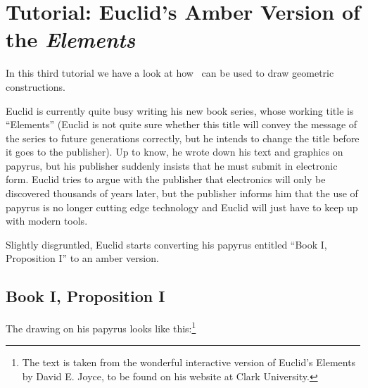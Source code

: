 %
%
%


\section{Tutorial: Euclid's Amber Version of the \emph{Elements}}

In this third tutorial we have a look at how \tikzname\ can be used to draw
geometric constructions.

Euclid is currently quite busy writing his new book series, whose working title
is ``Elements'' (Euclid is not quite sure whether this title will convey the
message of the series to future generations correctly, but he intends to change
the title before it goes to the publisher). Up to know, he wrote down his text
and graphics on papyrus, but his publisher suddenly insists that he must submit
in electronic form. Euclid tries to argue with the publisher that electronics
will only be discovered thousands of years later, but the publisher informs him
that the use of papyrus is no longer cutting edge technology and Euclid will
just have to keep up with modern tools.

Slightly disgruntled, Euclid starts converting his papyrus entitled ``Book I,
Proposition I'' to an amber version.


\subsection{Book I, Proposition I}

The drawing on his papyrus looks like this:\footnote{The text is taken from the
wonderful interactive version of Euclid's Elements by David E. Joyce, to be
found on his website at Clark University.}

